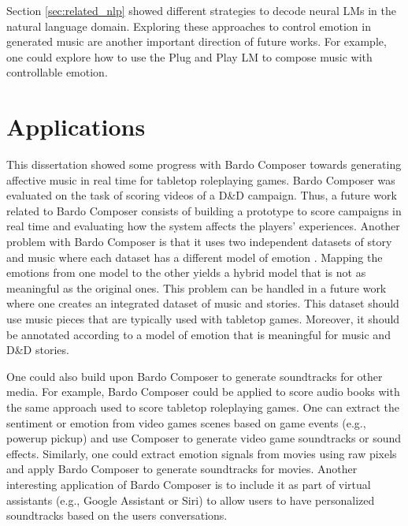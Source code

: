 Section \ref{sec:related_nlp} showed different strategies to decode neural LMs in the natural language domain. Exploring these approaches to control emotion in generated music are another important direction of future works. For example, one could explore how to use the Plug and Play LM \cite{dathathri2019plug} to compose music with controllable emotion.

\section{Applications}

This dissertation showed some progress with Bardo Composer towards generating affective music in real time for tabletop roleplaying games. Bardo Composer was evaluated on the task of scoring videos of a D\&D campaign. Thus, a future work related to Bardo Composer consists of building a prototype to score campaigns in real time and evaluating how the system affects the players' experiences. Another problem with Bardo Composer is that it uses two independent datasets of story and music where each dataset has a different model of emotion \cite{padovani2017}. Mapping the emotions from one model to the other yields a hybrid model that is not as meaningful as the original ones. This problem can be handled in a future work where one creates an integrated dataset of music and stories. This dataset should use music pieces that are typically used with tabletop games. Moreover, it should be annotated according to a model of emotion that is meaningful for music and D\&D stories.

One could also build upon Bardo Composer to generate soundtracks for other media. For example, Bardo Composer could be applied to score audio books with the same approach used to score tabletop roleplaying games. One can extract the sentiment or emotion from video games scenes based on game events (e.g., powerup pickup) and use Composer to generate video game soundtracks or sound effects. Similarly, one could extract emotion signals from movies using raw pixels and apply Bardo Composer to generate soundtracks for movies. Another interesting application of Bardo Composer is to include it as part of virtual assistants (e.g., Google Assistant or Siri) to allow users to have personalized soundtracks based on the users conversations.
